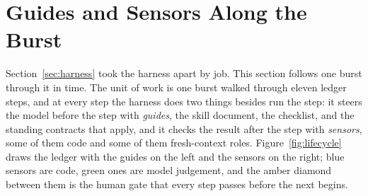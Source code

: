 \section{Guides and Sensors Along the Burst} \label{sec:sensors}

Section~\ref{sec:harness} took the harness apart by job. This section
follows one burst through it in time. The unit of work is one burst walked
through eleven ledger steps, and at every step the harness does two things
besides run the step: it steers the model before the step with
\emph{guides}, the skill document, the checklist, and the standing
contracts that apply, and it checks the result after the step with
\emph{sensors}, some of them code and some of them fresh-context roles.
Figure~\ref{fig:lifecycle} draws the ledger with the guides on the left and
the sensors on the right; blue sensors are code, green ones are model
judgement, and the amber diamond between them is the human gate that every
step passes before the next begins.

